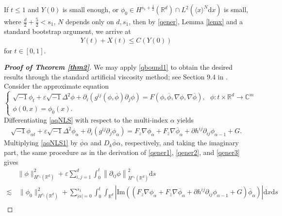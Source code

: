 \documentclass[10pt,twoside,a4paper]{article}
\numberwithin{equation}{section}\allowdisplaybreaks
\def\leq{\leqslant}
\begin{document}
If $ t\leq 1 $ and $ 	Y(0)   $	 is small enough, or $ \phi_0 \in H^{s_1+\frac12} (\mathbb{R}^d) \cap  L^2(\langle x\rangle^N \mathrm{d}x) $ is small, where $  \frac d2 +\frac 52<s_1 $, $ N $ depends only on $ d, s_1 $, then by \eqref{qener}, Lemma \ref{lemx} and a standard bootstrap argument,  we arrive at
\begin{align} \label{qbound1}
	Y(t) +X(t) \leq C\left(	Y(0)\right)
\end{align}
for $ t\in[0,1] $.



\begin{proof}[\textbf{Proof of Theorem \ref{thm2}}]
	We may apply \eqref{qbound1}  to obtain the desired results through the standard artificial viscosity method; see Section 9.4 in \cite{linares2014introduction}. 
	Consider the approximate equation	
	\begin{equation}	 \label{aqNLS}
		\begin{cases}
			\sqrt{-1}\phi_t+	\varepsilon\sqrt{-1}\Delta^2 \phi+\partial_i\left( g^{ij}\left(\phi,\overline{\phi}\right) \partial_j \phi\right)=F\left(\phi,\overline{\phi},\nabla\phi, \nabla \overline{\phi}\right)	,~~~\phi: t \times \mathbb{R}^d\rightarrow \mathbb{C}^m\\
			\phi(0,x)=\phi_0(x).
		\end{cases}
	\end{equation}
	Differentiating \eqref{aqNLS} with respect to the multi-index $\alpha$ yields
	\begin{align} \label{aqNLS1}
		\sqrt{-1}\phi_{\alpha t}+	\varepsilon\sqrt{-1}\Delta^2 \phi_\alpha+\partial_i\left( g^{ij} \partial_j \phi_{\alpha }\right)=F_z\nabla \phi_\alpha+F_{\overline{z}}\nabla \overline{\phi}_\alpha+\partial h^{ij}\partial_{ij } \phi_{\alpha -1}+G.
	\end{align}
Multiplying \eqref{aqNLS1} by $\overline{\phi}{\alpha}$ and $D_k \overline{\phi}{\alpha}$, respectively, and taking the imaginary part, the same procedure as in the derivation of \eqref{qener1}, \eqref{qener2}, and \eqref{qener3} gives
\begin{align*}
	&	\| \phi\|_{H^{s_1 }(\mathbb{R}^d)}^2+\varepsilon\sum_{i,j=1}^d\int_0^t\left\| \partial_{ij}\phi\right\|_{H^{s_1}(\mathbb{R}^d)}^2 \mathrm{d} s\\
	\lesssim &\, 		\| \phi_0\|_{H^{s_1 }(\mathbb{R}^d)}^2+\sum_{|\alpha|=0}^{s_1}\int_0^t\int_{\mathbb{R}^d} \left| \mathrm{Im} \left(  \left(F_z\nabla \phi_\alpha+F_{\overline{z}}\nabla \overline{\phi}_\alpha+\partial h^{ij}\partial_{ij } \phi_{\alpha -1}+G\right)\overline{\phi}_{\alpha }\right)\right| \mathrm{d} x\mathrm{d} s\\

\end{align*}
\end{proof}
\end{document}
